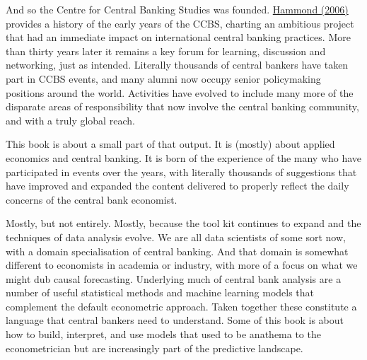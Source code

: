 \documentclass[
  letterpaper,
]{book}
\begin{document}
And so the Centre for Central Banking Studies was founded.
\href{https://www.bankofengland.co.uk/-/media/boe/files/quarterly-bulletin/2006/the-centre-for-central-banking-studies.pdf}{Hammond
(2006)} provides a history of the early years of the CCBS, charting an
ambitious project that had an immediate impact on international central
banking practices. More than thirty years later it remains a key forum
for learning, discussion and networking, just as intended. Literally
thousands of central bankers have taken part in CCBS events, and many
alumni now occupy senior policymaking positions around the world.
Activities have evolved to include many more of the disparate areas of
responsibility that now involve the central banking community, and with
a truly global reach.

This book is about a small part of that output. It is (mostly) about
applied economics and central banking. It is born of the experience of
the many who have participated in events over the years, with literally
thousands of suggestions that have improved and expanded the content
delivered to properly reflect the daily concerns of the central bank
economist.

Mostly, but not entirely. Mostly, because the tool kit continues to
expand and the techniques of data analysis evolve. We are all data
scientists of some sort now, with a domain specialisation of central
banking. And that domain is somewhat different to economists in academia
or industry, with more of a focus on what we might dub causal
forecasting. Underlying much of central bank analysis are a number of
useful statistical methods and machine learning models that complement
the default econometric approach. Taken together these constitute a
language that central bankers need to understand. Some of this book is
about how to build, interpret, and use models that used to be anathema
to the econometrician but are increasingly part of the predictive
landscape.
\end{document}
